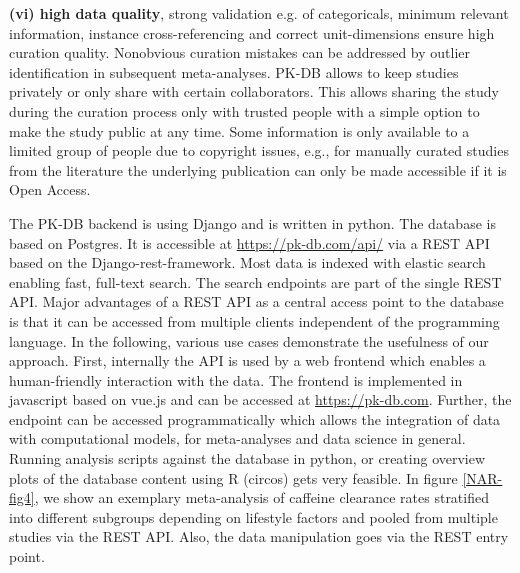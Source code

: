 \documentclass[a4,center,fleqn]{NAR}
\begin{document}
\textbf{(vi) high data quality}, strong validation e.g. of categoricals, minimum relevant information, instance cross-referencing and correct unit-dimensions ensure high curation quality. Nonobvious curation mistakes can be addressed by outlier identification in subsequent meta-analyses.
PK-DB allows to keep studies privately or only share with certain collaborators. This allows sharing the study during the curation process only with trusted people with a simple option to make the study public at any time. Some information is only available to a limited group of people due to copyright issues, e.g., for manually curated studies from the literature the underlying publication can only be made accessible if it is Open Access.
\par
The PK-DB backend is using Django and is written in python. The database is based on Postgres. It is accessible at \url{https://pk-db.com/api/} via a REST API based on the Django-rest-framework. Most data is indexed with elastic search enabling fast, full-text search. The search endpoints are part of the single REST API. Major advantages of a REST API as a central access point to the database is that it can be accessed from multiple clients independent of the programming language. In the following, various use cases demonstrate the usefulness of our approach. First, internally the API is used by a web frontend which enables a human-friendly interaction with the data. The frontend is implemented in javascript based on vue.js and can be accessed at \url{https://pk-db.com}. 
Further, the endpoint can be accessed programmatically which allows the integration of data with computational models, for meta-analyses and data science in general. Running analysis scripts against the database in python, or creating overview plots of the database content using R (circos) gets very feasible. In figure \ref{NAR-fig4}, we show an exemplary meta-analysis of caffeine clearance rates stratified into different subgroups depending on lifestyle factors and pooled from multiple studies via the  REST API. Also, the data manipulation goes via the  REST entry point.
\end{document}
